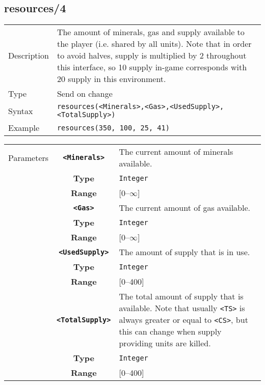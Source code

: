 \subsection{resources/4}
\begin{tabularx}{\textwidth}{lX}
 Description & The amount of minerals, gas and supply available to the player (i.e. shared by all units). Note that in order to avoid halves, supply is multiplied by 2 throughout this interface, so 10 supply in-game corresponds with 20 supply in this environment. \\
 Type & Send on change \\
 Syntax & \verb|resources(<Minerals>,<Gas>,<UsedSupply>,<TotalSupply>)| \\
 Example & \verb|resources(350, 100, 25, 41)| \\
 \end{tabularx}
 \begin{tabularx}{\textwidth}{l | c | p{8cm}|}
 \cline{2-3}
 Parameters & \textbf{\verb|<Minerals>|} & The current amount of minerals available. \\
            & \textbf{Type} & \verb|Integer| \\
            & \textbf{Range} & [0--$\infty$] \\
            \cline{2-3}
            & \textbf{\verb|<Gas>|} & The current amount of gas available. \\
            & \textbf{Type} & \verb|Integer| \\
            & \textbf{Range} & [0--$\infty$] \\
            \cline{2-3}
            & \textbf{\verb|<UsedSupply>|} & The amount of supply that is in use. \\
            & \textbf{Type} & \verb|Integer| \\
            & \textbf{Range} & [0--400] \\
            \cline{2-3}
            & \textbf{\verb|<TotalSupply>|} & The total amount of supply that is available. Note that usually \verb|<TS>| is always greater or equal to \verb|<CS>|, but this can change when supply providing units are killed. \\
            & \textbf{Type} & \verb|Integer| \\
            & \textbf{Range} & [0--400] \\
            \cline{2-3}
\end{tabularx}

